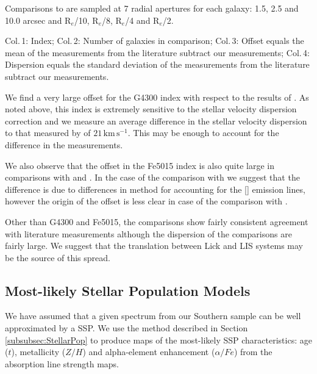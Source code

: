 \begin{table}
\begin{threeparttable}
\begin{tablenotes}
				\note Comparisons to \citet{Rampazzo2005} are sampled at 7 radial apertures for each galaxy: 1.5, 2.5 and 10.0 arcsec and R$_e$/10, R$_e$/8, R$_e$/4 and R$_e$/2. 
				\item Col.\,1: Index; Col.\,2: Number of galaxies in comparison; Col.\,3: Offset equals the mean of the measurements from the literature subtract our measurements; Col.\,4: Dispersion equals the standard deviation of the measurements from the literature subtract our measurements.
				\end{tablenotes}
			\end{threeparttable}
			\end{table}

			We find a very large offset for the G4300 index with respect to the results of \citet{Rampazzo2005}. As noted above, this index is extremely sensitive to the stellar velocity dispersion correction and we measure an average difference in the stellar velocity dispersion to that measured by \citet{Rampazzo2005} of $21\,\mathrm{km\,s^{-1}}$. This may be enough to account for the difference in the measurements.

			We also observe that the offset in the Fe5015 index is also quite large in comparisons with \citet{Rampazzo2005} and \citet{Vazdekis2010}. In the case of the comparison with \citet{Rampazzo2005} we suggest that the difference is due to differences in method for accounting for the [] emission lines, however the origin of the offset is less clear in case of the comparison with \citet{Vazdekis2010}. 

			Other than G4300 and Fe5015, the comparisons show fairly consistent agreement with literature measurements although the dispersion of the comparisons are fairly large. We suggest that the translation between Lick and LIS systems may be the source of this spread.


	\subsection{Most-likely Stellar Population Models}
		\label{subsec:ssp}
		We have assumed that a given spectrum from our Southern sample can be well approximated by a SSP. We use the method described in Section \ref{subsubsec:StellarPop} to produce maps of the most-likely SSP characteristics: age ($t$), metallicity ($Z/H$) and alpha-element enhancement ($\alpha/Fe$) from the absorption line strength maps. 

